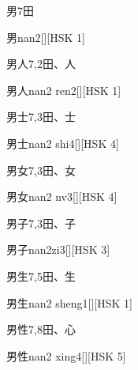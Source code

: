 \begin{entry}{男}{7}{⽥}
  \begin{phonetics}{男}{nan2}[][HSK 1]
  \end{phonetics}
\end{entry}

\begin{entry}{男人}{7,2}{⽥、⼈}
  \begin{phonetics}{男人}{nan2 ren2}[][HSK 1]
  \end{phonetics}
\end{entry}

\begin{entry}{男士}{7,3}{⽥、⼠}
  \begin{phonetics}{男士}{nan2 shi4}[][HSK 4]
  \end{phonetics}
\end{entry}

\begin{entry}{男女}{7,3}{⽥、⼥}
  \begin{phonetics}{男女}{nan2 nv3}[][HSK 4]
  \end{phonetics}
\end{entry}

\begin{entry}{男子}{7,3}{⽥、⼦}
  \begin{phonetics}{男子}{nan2zi3}[][HSK 3]
  \end{phonetics}
\end{entry}

\begin{entry}{男生}{7,5}{⽥、⽣}
  \begin{phonetics}{男生}{nan2 sheng1}[][HSK 1]
  \end{phonetics}
\end{entry}

\begin{entry}{男性}{7,8}{⽥、⼼}
  \begin{phonetics}{男性}{nan2 xing4}[][HSK 5]
  \end{phonetics}
\end{entry}

